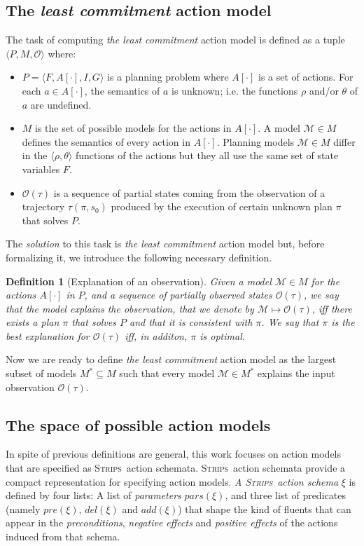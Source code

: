 \documentclass{article}
\newcommand{\tup}[1]{{\langle #1 \rangle}}
\newcommand{\strips}{\textsc{Strips}}
\newtheorem{definition}[theorem]{Definition}
\begin{document}
\subsection{The {\em least commitment} action model}
The task of computing {\em the least commitment} action model is defined as a tuple $\tup{P,M,\mathcal{O}}$ where:
\begin{itemize}
\item $P=\tup{F,A[\cdot],I,G}$ is a planning problem where $A[\cdot]$ is a set of actions. For each $a\in A[\cdot]$, the semantics of $a$ is unknown; i.e. the functions $\rho$ and/or $\theta$ of $a$ are undefined. 
\item $M$ is the set of possible models for the actions in $A[\cdot]$. A model $\mathcal{M}\in M$ defines the semantics of every action in $A[\cdot]$. Planning models $\mathcal{M}\in M$ differ in the $\tup{\rho,\theta}$ functions of the actions but they all use the same set of state variables $F$.
\item $\mathcal{O}(\tau)$ is a sequence of partial states coming from the observation of a trajectory $\tau(\pi,s_0)$ produced by the execution of certain unknown plan $\pi$ that solves $P$.
\end{itemize}

The {\em solution} to this task is {\em the least commitment} action model but, before formalizing it, we introduce the following necessary definition.

\begin{definition}[Explanation of an observation]
Given a model $\mathcal{M}\in M$ for the actions $A[\cdot]$ in $P$, and a sequence of partially observed states $\mathcal{O}(\tau)$, we say that {\em the model explains the observation}, that we denote by $\mathcal{M}\mapsto\mathcal{O}(\tau)$, iff there exists a plan $\pi$ that solves $P$ and that it is consistent with $\pi$. We say that $\pi$ is the {\em best explanation} for $\mathcal{O}(\tau)$ iff, in additon, $\pi$ is optimal.
\end{definition}

Now we are ready to define {\em the least commitment} action model as the largest subset of models $M^*\subseteq M$ such that every model $\mathcal{M}\in M^*$ explains the input observation $\mathcal{O}(\tau)$.


\subsection{The space of possible action models}
In spite of previous definitions are general, this work focuses on action models that are specified as \strips\ action schemata. \strips\ action schemata provide a compact representation for specifying action models. {\em A \strips\ action schema} $\xi$ is defined by four lists: A list of {\em parameters} $pars(\xi)$, and three list of predicates (namely $pre(\xi)$, $del(\xi)$ and $add(\xi)$) that shape the kind of fluents that can appear in the {\em preconditions}, {\em negative effects} and {\em positive effects} of the actions induced from that schema.
\end{document}
